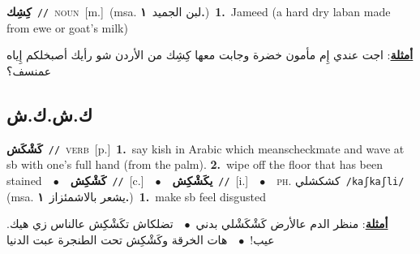 \documentclass[10pt,a4paper,twoside]{article} %
\begin{document}
\begin{multicols}{2}
{\setlength\topsep{0pt}\textbf{\foreignlanguage{arabic}{كِشِك}}\ {\color{gray}\texttt{//}\color{black}}\ \textsc{noun}\ [m.]\ \color{gray}(msa. \foreignlanguage{arabic}{لبن الجميد}~\foreignlanguage{arabic}{\textbf{١.}})\color{black}\ \textbf{1.}~Jameed (a hard dry laban made from ewe or goat's milk)\  \begin{flushright}\color{gray}\foreignlanguage{arabic}{\textbf{\underline{\foreignlanguage{arabic}{أمثلة}}}: اجت عندي إِم مأمون خضرة وجابت معها كِشِك من الأردن شو رأيك أصبخلكم إِياه عمنسف؟}\end{flushright}\color{black}} \vspace{2mm}

\vspace{-3mm}
\subsection*{\color{blue}\foreignlanguage{arabic}{ك.ش.ك.ش}\color{blue}{}} 

{\setlength\topsep{0pt}\textbf{\foreignlanguage{arabic}{كَشْكَش}}\ {\color{gray}\texttt{//}\color{black}}\ \textsc{verb}\ [p.]\ \textbf{1.}~say kish in Arabic which meanscheckmate and wave at sb with one's full hand (from the palm).  \textbf{2.}~wipe off the floor that has been stained\ \ $\bullet$\ \ \setlength\topsep{0pt}\textbf{\foreignlanguage{arabic}{كَشْكِش}}\ {\color{gray}\texttt{//}\color{black}}\ [c.]\ \ $\bullet$\ \ \setlength\topsep{0pt}\textbf{\foreignlanguage{arabic}{يكَشْكِش}}\ {\color{gray}\texttt{//}\color{black}}\ [i.]\ \ $\bullet$\ \ \textsc{ph.} \color{gray} \foreignlanguage{arabic}{كشكشلي}\color{black}\ {\color{gray}\texttt{/{\sffamily kaʃkaʃli}/}\color{black}}\ \color{gray} (msa. \foreignlanguage{arabic}{يشعر بالاشمئزاز}~\foreignlanguage{arabic}{\textbf{١.}})\color{black}\ \textbf{1.}~make sb feel disgusted\  \begin{flushright}\color{gray}\foreignlanguage{arabic}{\textbf{\underline{\foreignlanguage{arabic}{أمثلة}}}: منظر الدم عالأرض كَشْكَشْلي بدني\ $\bullet$\ \  تضلكاش تكَشْكِش عالناس زي هيك. عيب!\ $\bullet$\ \  هات الخرقة وكَشْكِش تحت الطنجرة عبت الدنيا}\end{flushright}\color{black}} \vspace{2mm}


\end{multicols}
\end{document}
